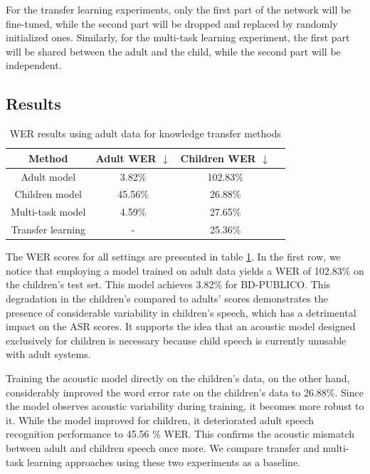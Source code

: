 For the transfer learning experiments, only the first part of the network will be fine-tuned, while the second part will be dropped and replaced by randomly initialized ones. Similarly, for the multi-task learning experiment, the first part will be shared between the adult and the child, while the second part will be independent.



\subsection{Results}
\begin{table}[h]
\centering
\begin{tabular}{c|ccc}
\hline
 Method & Adult WER $\downarrow$   & Children WER  $\downarrow$   \\ \hline
\multicolumn{1}{c|}{Adult model} & 3.82\%   &  102.83\%\\ 
\multicolumn{1}{c|}{Children model} & 45.56\%  & 26.88\% \\ 
\multicolumn{1}{c|}{Multi-task model}  &   4.59\% &  27.65\% \\ 
\multicolumn{1}{c|}{Transfer learning} &  -  & 25.36\% \\ \hline


\end{tabular}

\caption{WER results using adult data for knowledge transfer methods}
\label{tab:res_exp1}
\end{table}

The WER scores for all settings are presented in table \ref{tab:res_exp1}. In the first row, we notice that employing a model trained on adult data yields a WER of 102.83\% on the children's test set. This model achieves 3.82\% for BD-PUBLICO. This degradation in the children's compared to adults' scores demonstrates the presence of considerable variability in children's speech, which has a detrimental impact on the ASR scores. It supports the idea that an acoustic model designed exclusively for children is necessary because child speech is currently unusable with adult systems.

Training the acoustic model directly on the children's data, on the other hand, considerably improved the word error rate on the children's data to 26.88\%. Since the model observes acoustic variability during training, it becomes more robust to it. While the model improved for children, it deteriorated adult speech recognition performance to 45.56 \% WER. This confirms the acoustic mismatch between adult and children speech once more. We compare transfer and multi-task learning approaches using these two experiments as a baseline.

